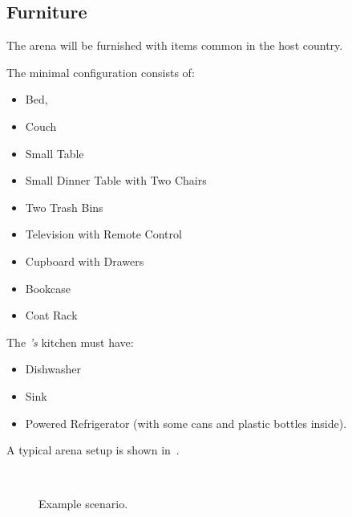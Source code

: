 \subsection{Furniture}
\label{sec:rules:scenario:furniture}
The arena will be furnished with items common in the host country.

The minimal configuration consists of:
\begin{itemize}
	\item Bed,
	\item Couch
	\item Small Table
	\item Small Dinner Table with Two Chairs
	\item Two Trash Bins
	\item Television with Remote Control
	\item Cupboard with Drawers
	\item Bookcase
	\item Coat Rack
\end{itemize}

The \Arena\textit{'s} kitchen must have:
\begin{itemize}
	\item Dishwasher
	\item Sink
	\item Powered Refrigerator (with some cans and plastic bottles inside).
\end{itemize}

A typical arena setup is shown in~.

\begin{figure}[H]
	\centering
	 ~
	\caption{Example \RoboCup\AtHome{} scenario.}
	\label{fig:arena}
\end{figure}

